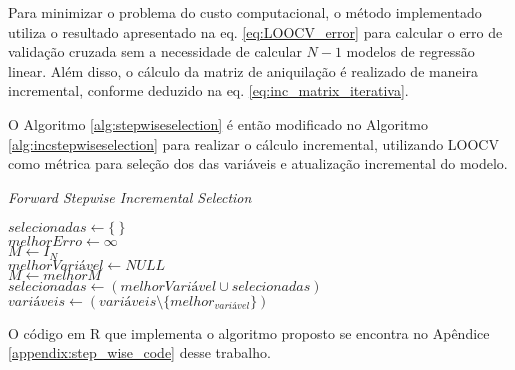 Para minimizar o problema do custo computacional, o método implementado utiliza o resultado apresentado na eq. \ref{eq:LOOCV_error} para calcular o erro de validação cruzada sem a necessidade de calcular $N-1$ modelos de regressão linear. Além disso, o cálculo da matriz de aniquilação é realizado de maneira incremental, conforme deduzido na eq. \ref{eq:inc_matrix_iterativa}.

O Algoritmo \ref{alg:stepwiseselection} é então modificado no Algoritmo \ref{alg:incstepwiseselection} para realizar o cálculo incremental, utilizando LOOCV como métrica para seleção dos das variáveis e atualização incremental do modelo.

\begin{algorithm}[!htb]
    \caption{\textit{Forward Stepwise Incremental Selection}}
    
    $selecionadas \gets \{\ \}$ \\
    $melhorErro \gets \infty$ \\
    $M \gets I_N$ \\

    { 
        $melhorVariável \gets NULL$ \\
        $M \gets melhorM $ \\
        $selecionadas \gets (melhorVariável \cup selecionadas)$ \\
        $variáveis \gets (variáveis \setminus \{melhor_{variável}\})$ \\
    }
    \label{alg:incstepwiseselection}
\end{algorithm}

O código em R que implementa o algoritmo proposto se encontra no Apêndice \ref{appendix:step_wise_code} desse trabalho.

\FloatBarrier

